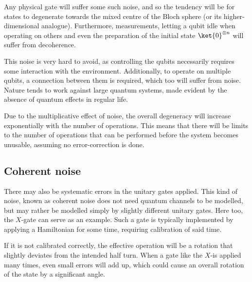 Any physical gate will suffer some such noise, and so the tendency will be for states to degenerate towards the mixed centre of the Bloch sphere (or its higher-dimensional analogue).
Furthermore, measurements, letting a qubit idle when operating on others and even the preparation of the initial state $\ket{0}^{\otimes n}$ will suffer from decoherence.

This noise is very hard to avoid, as controlling the qubits necessarily requires some interaction with the environment.
Additionally, to operate on multiple qubits, a connection between them is required, which too will suffer from noise.
Nature tends to work against large quantum systems, made evident by the absence of quantum effects in regular life.

Due to the multiplicative effect of noise, the overall degeneracy will increase exponentially with the number of operations.
This means that there will be limits to the number of operations that can be performed before the system becomes unusable, assuming no error-correction is done.

\subsection{Coherent noise}
There may also be systematic errors in the unitary gates applied.
This kind of noise, known as coherent noise does not need quantum channels to be modelled, but may rather be modelled simply by slightly different unitary gates.
Here too, the $X$-gate can serve as an example.
Such a gate is typically implemented by applying a Hamiltonian for some time, requiring calibration of said time.

If it is not calibrated correctly, the effective operation will be a rotation that slightly deviates from the intended half turn.
When a gate like the $X$-is applied many times, even small errors will add up, which could cause an overall rotation of the state by a significant angle.


